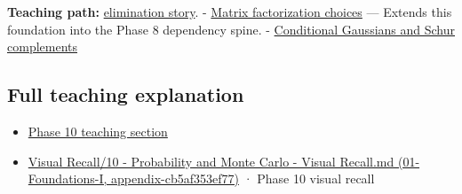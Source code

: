 \textbf{Teaching path:} \href{Continuous\%20Notes/Computing\%20Foundations\%20-\%20From\%20Bits\%20to\%20C++\%20and\%20Systems\%20APIs\#Elimination\%20turns\%20the\%20geometry\%20into\%20an\%20auditable\%20calculation}{elimination story}. - \hyperref[appendix-221a483bec2d]{Matrix factorization choices} --- Extends this foundation into the Phase 8 dependency spine. - \hyperref[appendix-f0437ea55a47]{Conditional Gaussians and Schur complements}

\subsection{Full teaching explanation}\label{full-teaching-explanation}

\begin{itemize}
\tightlist
\item
  \href{Continuous\%20Notes/Computing\%20Foundations\%20-\%20From\%20Bits\%20to\%20C++\%20and\%20Systems\%20APIs\#5.\%20Waiting\%20times,\%20event\%20counts,\%20and\%20covariance\%20geometry}{Phase 10 teaching section}
\item
  \href{}{Visual Recall/10 - Probability and Monte Carlo - Visual Recall.md (01-Foundations-I, appendix-cb5af353ef77)} · Phase 10 visual recall
\end{itemize}
